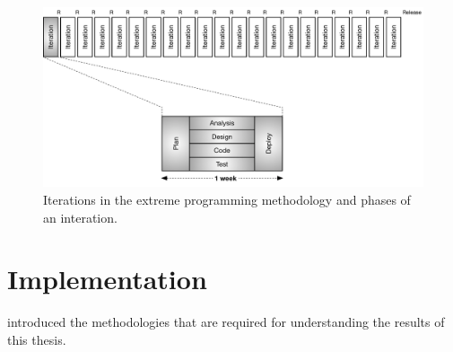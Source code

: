 \documentclass[%
    a4paper,    %
    justified,  %
    nobib,      %
    openany     %
]{tufte-book}
\makeatletter
\renewcommand{\label}[1]{\@tufte@label{##1}}%
\makeatother
\begin{document}
\begin{figure}[ht]
  \includegraphics[width=0.95\linewidth]{images/xp}
  \caption{Iterations in the extreme programming methodology and phases of an
    interation.~\cite[p. 18]{shore-aad-2007}}
  \label{fig:xp}
\end{figure}


\chapter{Implementation}
\label{chap:implementation}


 introduced the methodologies that are required
for understanding the results of this thesis.
\end{document}

